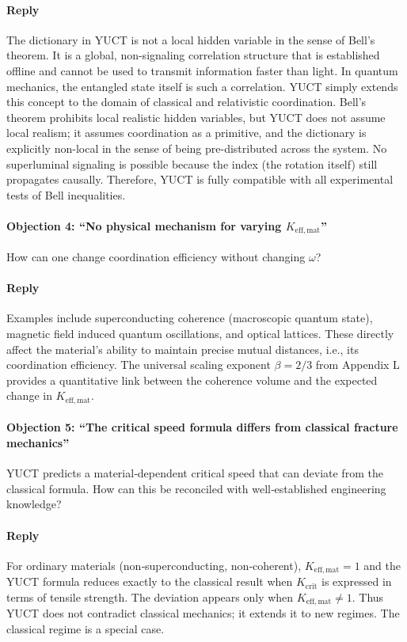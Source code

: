 \documentclass[12pt,a4paper]{article}
\newcommand{\betaf}{\beta}
\newcommand{\Kcrit}{K_{\mathrm{crit}}}
\begin{document}
	\paragraph{Reply}
	The dictionary in YUCT is not a local hidden variable in the sense of Bell's theorem. It is a global, non-signaling correlation structure that is established offline and cannot be used to transmit information faster than light. In quantum mechanics, the entangled state itself is such a correlation. YUCT simply extends this concept to the domain of classical and relativistic coordination. Bell's theorem prohibits local realistic hidden variables, but YUCT does not assume local realism; it assumes coordination as a primitive, and the dictionary is explicitly non-local in the sense of being pre-distributed across the system. No superluminal signaling is possible because the index (the rotation itself) still propagates causally. Therefore, YUCT is fully compatible with all experimental tests of Bell inequalities.
	
	\paragraph{Objection 4: ``No physical mechanism for varying \(K_{\mathrm{eff,mat}}\)''}
	How can one change coordination efficiency without changing \(\omega\)?
	
	\paragraph{Reply}
	Examples include superconducting coherence (macroscopic quantum state), magnetic field induced quantum oscillations, and optical lattices. These directly affect the material's ability to maintain precise mutual distances, i.e., its coordination efficiency. The universal scaling exponent \(\betaf = 2/3\) from Appendix L provides a quantitative link between the coherence volume and the expected change in \(K_{\mathrm{eff,mat}}\).
	
	\paragraph{Objection 5: ``The critical speed formula differs from classical fracture mechanics''}
	YUCT predicts a material‑dependent critical speed that can deviate from the classical formula. How can this be reconciled with well‑established engineering knowledge?
	
	\paragraph{Reply}
	For ordinary materials (non‑superconducting, non‑coherent), \(K_{\mathrm{eff,mat}} = 1\) and the YUCT formula reduces exactly to the classical result when \(\Kcrit\) is expressed in terms of tensile strength. The deviation appears only when \(K_{\mathrm{eff,mat}} \neq 1\). Thus YUCT does not contradict classical mechanics; it extends it to new regimes. The classical regime is a special case.
	
\end{document}
